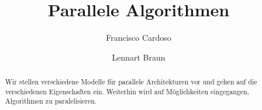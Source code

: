 \title{Parallele Algorithmen}

\author{Francisco Cardoso \and Lennart Braun}


\maketitle
 

\begin{abstract}
Wir stellen verschiedene Modelle für parallele Architekturen vor und gehen auf die verschiedenen Eigenschaften ein. Weiterhin wird auf Möglichkeiten eingegangen, Algorithmen zu paralelisieren.
\end{abstract}





\printbibliography

